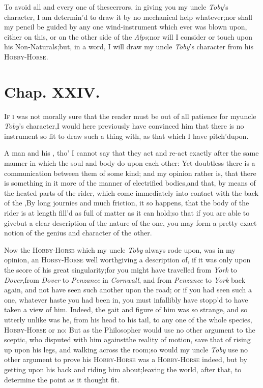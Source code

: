 \documentclass{article}
\begin{document}
To avoid all and every one of these\break errors, in giving you my
uncle \textit{Toby}’s character, I am determin’d to draw it
by\pb
no mechanical help whatever;\tsh  nor shall my pencil be guided by
any one wind-instrument which ever was blown upon, either on this,
or on the other side of the \textit{Alps};\tsk  nor will I
consider\break
{}
or touch upon his
Non-Naturals;\tsk but, in a word, I will draw my uncle
\textit{Toby}’s character from his
\textsc{Hobby-Horse}.

\bigskip

\section{Chap. XXIV.}

\lettrine{I}{f i} was not morally sure that the
reader must be out of all patience for my\break uncle \textit{Toby}’s
character,\tsh  I would here previously have convinced him
that there is no instrument so fit to draw such a thing with, as
that which I have pitch’d\break upon.

\newpage
A man and his ,\break
tho’ I cannot say that they act and re-act exactly after the
same manner in which the soul and body do upon each other: Yet
doubtless there is a communication between them of some kind; and
my opinion rather is, that there is something in it more of the
manner of electrified bodies,\tsk  and that, by means of the
heated parts of the rider, which come immediately into contact with
the back of the ,\tsk  By
long journies and much friction, it so happens, that the body of
the rider is at length fill’d as full of
 matter as it can
hold;\tsk  so that if you are able to give\break but a clear description of the nature
of the one, you may form a pretty exact notion of the genius and
character of the other.

\newpage
Now the \textsc{Hobby-Horse} which my uncle \textit{Toby} always rode
upon, was in my opinion, an \textsc{Hobby-Horse} well worth\break giving
a description of, if it was only upon the score of his great
singularity;\break for you might have travelled from \textit{York} to
\textit{Dover},\tsk  from \textit{Dover} to \textit{Penzance} in
\textit{Cornwall}, and from \textit{Penzance} to \textit{York} back
again, and not have seen such another upon the road; or if you had seen
such a one, whatever haste you had been in, you must infallibly have
stopp’d to have taken a view of him. Indeed, the gait and figure of him
was so strange, and so utterly unlike was he, from his head to his tail,
to any one of the whole species, 
\textsc{Hobby-Horse} or no: But as the Philo\-so\-pher would use no other
argument to the sceptic, who disputed with him against\pb the reality of
motion, save that of rising up upon his legs, and walking across the
room;\tsk  so would my uncle \textit{Toby} use no other argument to
prove his \textsc{Hobby-Horse} was a \textsc{Hobby-Horse} indeed, but by
getting upon his back and riding him about;\tsk  leaving the world,
after that, to determine the point as it thought fit.
\end{document}
